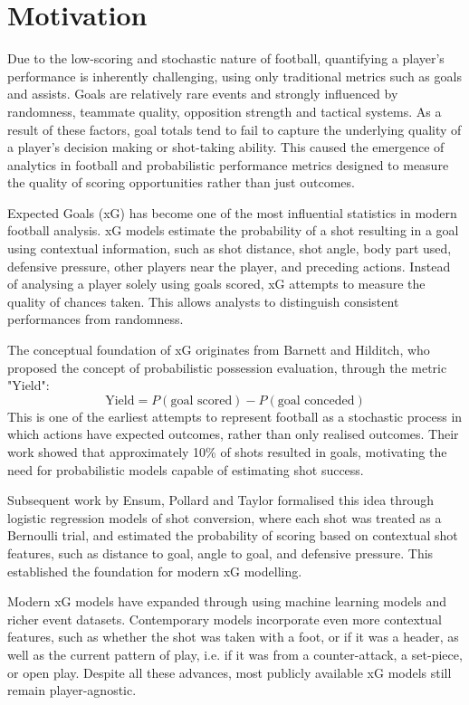 \documentclass{article}
\begin{document}
\section{Motivation}
Due to the low-scoring and stochastic nature of football, quantifying a player's performance is inherently challenging, using only traditional metrics such as goals and assists. Goals are relatively rare events and strongly influenced by randomness, teammate quality, opposition strength and tactical systems. As a result of these factors, goal totals tend to fail to capture the underlying quality of a player's decision making or shot-taking ability. This caused the emergence of analytics in football and probabilistic performance metrics designed to measure the quality of scoring opportunities rather than just outcomes.

Expected Goals (xG) has become one of the most influential statistics in modern football analysis. xG models estimate the probability of a shot resulting in a goal using contextual information, such as shot distance, shot angle, body part used, defensive pressure, other players near the player, and preceding actions. Instead of analysing a player solely using goals scored, xG attempts to measure the quality of chances taken. This allows analysts to distinguish consistent performances from randomness.

The conceptual foundation of xG originates from Barnett and Hilditch\cite{barnett1993}, who proposed the concept of probabilistic possession evaluation, through the metric "Yield":
\begin{equation}
    \text{Yield} = P (\text{goal scored}) - P(\text{goal conceded})
\end{equation}
This is one of the earliest attempts to represent football as a stochastic process in which actions have expected outcomes, rather than only realised outcomes. Their work showed that approximately 10\% of shots resulted in goals, motivating the need for probabilistic models capable of estimating shot success.

Subsequent work by Ensum, Pollard and Taylor\cite{ensum2004} formalised this idea through logistic regression models of shot conversion, where each shot was treated as a Bernoulli trial, and estimated the probability of scoring based on contextual shot features, such as distance to goal, angle to goal, and defensive pressure. This established the foundation for modern xG modelling.

Modern xG models have expanded through using machine learning models and richer event datasets\cite{mead2023}. Contemporary models incorporate even more contextual features, such as whether the shot was taken with a foot, or if it was a header, as well as the current pattern of play, i.e. if it was from a counter-attack, a set-piece, or open play. Despite all these advances, most publicly available xG models still remain player-agnostic.
\end{document}
